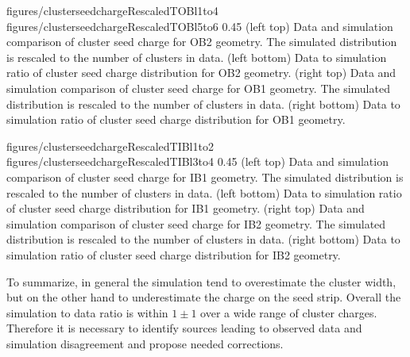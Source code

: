                  {figures/clusterseedchargeRescaledTOBl1to4}
                 {figures/clusterseedchargeRescaledTOBl5to6} %
                 {0.45}       %
                 {(left top) Data and simulation comparison of cluster seed charge for OB2 geometry. The simulated distribution is rescaled to the number of clusters in data. (left bottom) Data to simulation ratio of cluster seed charge distribution for OB2 geometry. (right top) Data and simulation comparison of cluster seed charge for OB1 geometry. The simulated distribution is rescaled to the number of clusters in data. (right bottom) Data to simulation ratio of cluster seed charge distribution for OB1 geometry. }

                 {figures/clusterseedchargeRescaledTIBl1to2}
                 {figures/clusterseedchargeRescaledTIBl3to4} %
                 {0.45}       %
                 {(left top) Data and simulation  comparison of cluster seed charge for IB1 geometry. The simulated distribution is rescaled to the number of clusters in data. (left bottom) Data to simulation ratio of cluster seed charge distribution for IB1 geometry. (right top) Data and simulation comparison of cluster seed charge for IB2 geometry. The simulated distribution is rescaled to the number of clusters in data. (right bottom) Data to simulation ratio of cluster seed charge distribution for IB2 geometry. }

To summarize, in general the simulation tend to overestimate the cluster width, but on the other hand to underestimate the charge on the seed strip. Overall the simulation to data ratio is within $1 \pm 1$ over a wide range of cluster charges.  Therefore it is necessary to identify sources leading to observed data and simulation disagreement and propose needed corrections.

